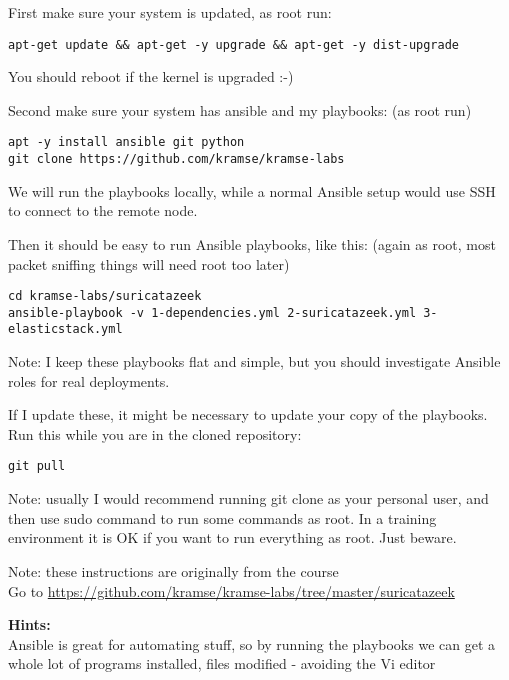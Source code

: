 \documentclass[a4paper,11pt,notitlepage]{report}
\begin{document}
First make sure your system is updated, as root run:

\begin{verbatim}
apt-get update && apt-get -y upgrade && apt-get -y dist-upgrade
\end{verbatim}

You should reboot if the kernel is upgraded :-)

Second make sure your system has ansible and my playbooks: (as root run)
\begin{verbatim}
apt -y install ansible git python
git clone https://github.com/kramse/kramse-labs
\end{verbatim}

We will run the playbooks locally, while a normal Ansible setup would use SSH to connect to the remote node.

Then it should be easy to run Ansible playbooks, like this: (again as root, most packet sniffing things will need root too later)

\begin{verbatim}
cd kramse-labs/suricatazeek
ansible-playbook -v 1-dependencies.yml 2-suricatazeek.yml 3-elasticstack.yml
\end{verbatim}

Note: I keep these playbooks flat and simple, but you should investigate Ansible roles for real deployments.

If I update these, it might be necessary to update your copy of the playbooks. Run this while you are in the cloned repository:

\begin{verbatim}
git pull
\end{verbatim}

Note: usually I would recommend running git clone as your personal user, and then use sudo command to run some commands as root. In a training environment it is OK if you want to run everything as root. Just beware.

Note: these instructions are originally from the course\\
Go to \url{https://github.com/kramse/kramse-labs/tree/master/suricatazeek}

{\bf Hints:}\\
Ansible is great for automating stuff, so by running the playbooks we can get a whole lot of programs installed, files modified - avoiding the Vi editor \smiley
\end{document}
